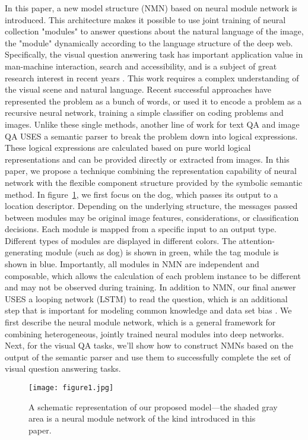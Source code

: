 \documentclass[a4paper,18pt]{article}
\begin{document}
In this paper, a new model structure (NMN) based on neural module network is introduced. This architecture makes it possible to use joint training of neural collection "modules" to answer questions about the natural language of the image, the "module" dynamically according to the language structure of the deep web. Specifically, the visual question answering task has important application value in man-machine interaction, search and accessibility, and is a subject of great research interest in recent years \cite{Antol_2015_Vqa}. This work requires a complex understanding of the visual scene and natural language. Recent successful approaches have represented the problem as a bunch of words, or used it to encode a problem as a recursive neural network, training a simple classifier on coding problems and images. Unlike these single methods, another line of work for text QA and image QA USES a semantic parser to break the problem down into logical expressions. These logical expressions are calculated based on pure world logical representations and can be provided directly or extracted from images\cite{Krishnamurthyi_2015_Jointly}. In this paper, we propose a technique combining the representation capability of neural network with the flexible component structure provided by the symbolic semantic method. In figure~\ref{pic1}, we first focus on the dog, which passes its output to a location descriptor. Depending on the underlying structure, the messages passed between modules may be original image features, considerations, or classification decisions. Each module is mapped from a specific input to an output type. Different types of modules are displayed in different colors. The attention-generating module (such as dog) is shown in green, while the tag module is shown in blue. Importantly, all modules in NMN are independent and composable, which allows the calculation of each problem instance to be different and may not be observed during training. In addition to NMN, our final answer USES a looping network (LSTM) to read the question, which is an additional step that is important for modeling common knowledge and data set bias \cite{Malinowski_2015_Ask}. We first describe the neural module network, which is a general framework for combining heterogeneous, jointly trained neural modules into deep networks. Next, for the visual QA tasks, we'll show how to construct NMNs based on the output of the semantic parser and use them to successfully complete the set of visual question answering tasks.
	\begin{figure}[htp]
	\centering
	\texttt{[image: figure1.jpg]}
	\caption{   A schematic representation of our proposed model—the
		shaded gray area is a neural module network of the kind introduced
		in this paper. 
 }\label{pic1}
\end{figure}
\end{document}
